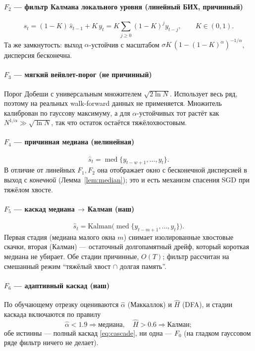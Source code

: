 \documentclass[conference]{IEEEtran}
\theoremstyle{plain}
\theoremstyle{definition}
\DeclareMathOperator{\med}{med}
\begin{document}
\paragraph*{$F_2$ --- фильтр Калмана локального уровня (линейный БИХ, причинный)}
\begin{equation}
\hat s_t=(1-K)\,\hat s_{t-1}+K\,y_t
       =K\sum_{j\ge0}(1-K)^{j}y_{t-j},\qquad K\in(0,1).
\end{equation}
Та же замкнутость: выход $\alpha$-устойчив с масштабом
$\sigma K\,(1-(1-K)^\alpha)^{-1/\alpha}$, дисперсия бесконечна.

\paragraph*{$F_3$ --- мягкий вейвлет-порог (не причинный)}
Порог Добеши с универсальным множителем $\sqrt{2\ln N}$. Использует весь
ряд, поэтому на реальных walk-forward данных не применяется. Множитель
калиброван по гауссову максимуму, а для $\alpha$-устойчивых тот растёт
как $N^{1/\alpha}\gg\sqrt{\ln N}$, так что остаток остаётся
тяжёлохвостовым.

\paragraph*{$F_4$ --- причинная медиана (нелинейная)}
\begin{equation}
\hat s_t=\med\{y_{t-w+1},\dots,y_t\}.
\end{equation}
В отличие от линейных $F_1,F_2$ она отображает окно с бесконечной
дисперсией в выход с \emph{конечной} (Лемма~\ref{lem:median}); это и есть
механизм спасения SGD при тяжёлом хвосте.

\paragraph*{$F_5$ --- каскад медиана\,$\to$\,Калман (наш)}
\begin{equation}
\hat s_t=\mathrm{Kalman}\big(\med\{y_{t-m+1},\dots,y_t\}\big).
\label{eq:cascade}
\end{equation}
Первая стадия (медиана малого окна $m$) снимает изолированные хвостовые
скачки, вторая (Калман) --- остаточный долгопамятный дрейф, который
короткая медиана не убирает. Обе стадии причинные, $O(T)$; фильтр
рассчитан на смешанный режим ``тяжёлый хвост $\cap$ долгая память''.

\paragraph*{$F_6$ --- адаптивный каскад (наш)}
По обучающему отрезку оцениваются $\hat\alpha$ (Маккаллок) и $\hat H$
(DFA), и стадии каскада включаются по правилу
\begin{equation}
\hat\alpha<1.9\Rightarrow\text{медиана},\quad
\hat H>0.6\Rightarrow\text{Калман};
\end{equation}
обе истинны --- полный каскад \eqref{eq:cascade}, ни одна --- $F_0$ (на
гладком гауссовом ряде фильтр ничего не делает).
\end{document}
